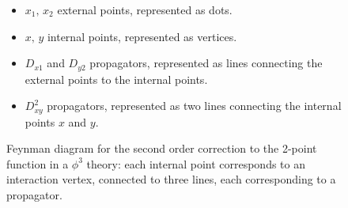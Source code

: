\begin{figure}[H]
    \begin{minipage}{0.45\textwidth}
        \centering
        \caption{Feynman diagram for the second order correction to the 2-point function in a \(\phi^3\) theory: each internal point corresponds to an interaction vertex, connected to three lines, each corresponding to a propagator.}
    \end{minipage}
    \hfill
    \begin{minipage}{0.5\textwidth}
        \begin{itemize}
            \item \(x_1, \, x_2\) external points, represented as dots.
            \item \(x, \, y\) internal points, represented as vertices.
            \item \(D_{x 1}\) and \(D_{y 2}\) propagators, represented as lines connecting the external points to the internal points.
            \item \(D_{x y}^2\) propagators, represented as two lines connecting the internal points \(x\) and \(y\).
        \end{itemize}
    \end{minipage}
\end{figure}

